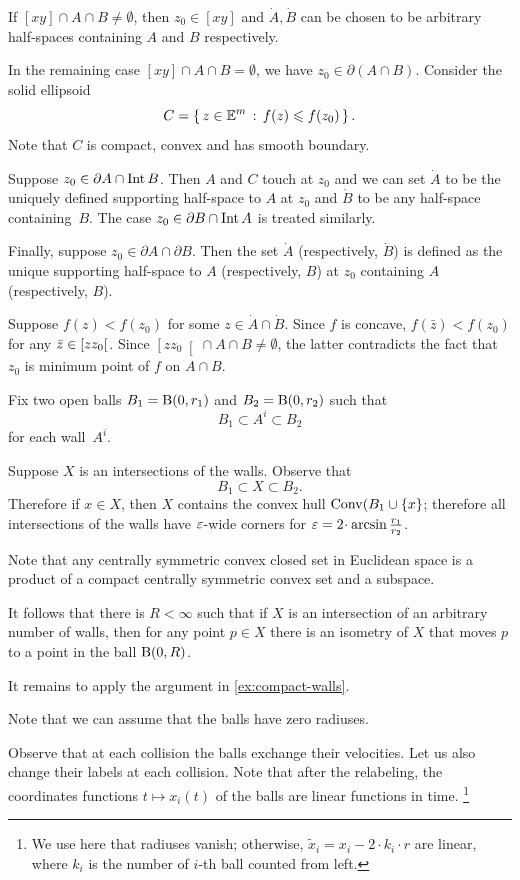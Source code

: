 If $[xy]\cap A\cap B\ne \emptyset$, then $z_0\in [xy]$ and $\dot A, \dot B$ can be chosen to be arbitrary half-spaces containing $A$ and $B$ respectively.  

In the remaining case $[xy]\cap A\cap B=\emptyset$, 
we have $z_0\in\partial (A\cap B)$.  
Consider the solid ellipsoid
\[C=\left\{\,{z\in\mathbb{E}^m}\,:\,{f(z)\leqslant f(z_0)}\,\right\}.\] 
Note that $C$ is compact, convex and has  smooth boundary. 

Suppose $z_0\in\partial  A \cap \operatorname{\rm Int}\nolimits B$. 
Then $A$ and $C$ touch at $z_0$ and we can set $\dot A$ to be the uniquely defined supporting half-space to $A$  at $z_0$ and $\dot B$ to be any half-space containing~$B$. 
The case $z_0\in\partial B \cap \operatorname{\rm Int}\nolimits A$ is treated similarly.


Finally, suppose $z_0\in\partial A\cap\partial B$. 
Then the set  $\dot A$ (respectively, $\dot B$) is defined as the unique supporting half-space to $A$ (respectively, $B$) at $z_0$ containing $A$ (respectively, $B$).

Suppose $f(z)<f(z_0)$ for some $z\in \dot A\cap\dot B$.
Since $f$ is concave,
$f(\bar z)<f(z_0)$ for any $\bar z \z\in \left[zz_0\right[$.
Since $\left[zz_0\right[\cap A\cap B\ne\emptyset$,
the latter contradicts the fact that $z_0$ is minimum point of $f$ on $A\cap B$.


Fix two open balls $B_1\z=\oBall(0,r_1)$ and $B_2=\mathrm{B}{}(0,r_2)$
such that 
\[B_1\subset A^i\subset B_2\]
for each wall~$A^i$.

Suppose $X$ is an intersections of  the walls.
Observe that 
\[B_1\subset X\subset B_2.\]
Therefore if $x\in X$, then $X$ contains the convex hull $\mathop{\rm Conv}\nolimits(B_1\cup\{x\}$;
therefore all intersections of the walls have $\varepsilon$-wide corners for $\eps\z=2\cdot \arcsin\tfrac{r_1}{r_2}$.

Note that any centrally symmetric convex closed set in Euclidean space is a product of a compact centrally symmetric convex set and a subspace.

It follows that there is $R<\infty$
such that if $X$ is an intersection of an arbitrary number of walls, then for any point $p\in X$ there is an isometry of $X$ 
that moves  $p$ to a point in the ball $\mathrm{B}{}(0,R)$.

It remains to apply the argument in \ref{ex:compact-walls}.

Note that we can assume that the balls have zero radiuses.

Observe that at each collision the balls exchange their velocities.
Let us also change their labels at each collision.
Note that after the relabeling,  the coordinates functions $t\mapsto x_{i}(t)$ of the balls are linear functions in time.%
\footnote{We use here that radiuses vanish; otherwise, $\tilde x_i=x_i-2\cdot k_i\cdot r$ are linear, where $k_i$ is the number of $i$-th ball counted from left.} 

